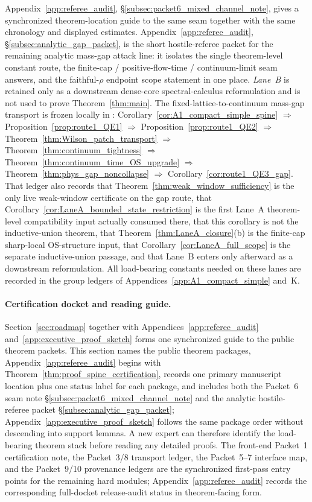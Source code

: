 Appendix~\ref{app:referee_audit}, \S\ref{subsec:packet6_mixed_channel_note}, gives a synchronized theorem-location guide to the same seam together with the same chronology and displayed estimates.
Appendix~\ref{app:referee_audit}, \S\ref{subsec:analytic_gap_packet}, is the short hostile-referee packet for the remaining analytic mass-gap attack line: it isolates the single theorem-level constant route, the finite-cap / positive-flow-time / continuum-limit seam answers, and the faithful-$\rho$ endpoint scope statement in one place.
\emph{Lane~B} is retained only as a downstream dense-core spectral-calculus reformulation and is not used to prove Theorem~\ref{thm:main}.
The fixed-lattice-to-continuum mass-gap transport is frozen locally in : Corollary~\ref{cor:A1_compact_simple_spine} $\Rightarrow$ Proposition~\ref{prop:route1_QE1} $\Rightarrow$ Proposition~\ref{prop:route1_QE2} $\Rightarrow$ Theorem~\ref{thm:Wilson_patch_transport} $\Rightarrow$ Theorem~\ref{thm:continuum_tightness} $\Rightarrow$ Theorem~\ref{thm:continuum_time_OS_upgrade} $\Rightarrow$ Theorem~\ref{thm:phys_gap_noncollapse} $\Rightarrow$ Corollary~\ref{cor:route1_QE3_gap}.
That ledger also records that Theorem~\ref{thm:weak_window_sufficiency} is the only live weak-window certificate on the gap route, that Corollary~\ref{cor:LaneA_bounded_state_restriction} is the first Lane~A theorem-level compatibility input actually consumed there, that this corollary is not the inductive-union theorem, that Theorem~\ref{thm:LaneA_closure}(b) is the finite-cap sharp-local OS-structure input, that Corollary~\ref{cor:LaneA_full_scope} is the separate inductive-union passage, and that Lane~B enters only afterward as a downstream reformulation.
All load-bearing constants needed on these lanes are recorded in the group ledgers of Appendices~\ref{app:A1_compact_simple} and~K.

\paragraph{Certification docket and reading guide.}
Section~\ref{sec:roadmap} together with Appendices~\ref{app:referee_audit} and~\ref{app:executive_proof_sketch} forms one synchronized guide to the public theorem packets.
This section names the public theorem packages, Appendix~\ref{app:referee_audit} begins with Theorem~\ref{thm:proof_spine_certification}, records one primary manuscript location plus one status label for each package, and includes both the Packet~6 seam note \S\ref{subsec:packet6_mixed_channel_note} and the analytic hostile-referee packet \S\ref{subsec:analytic_gap_packet}; Appendix~\ref{app:executive_proof_sketch} follows the same package order without descending into support lemmas.
A new expert can therefore identify the load-bearing theorem stack before reading any detailed proofs.
The front-end Packet~1 certification note, the Packet~3/8 transport ledger, the Packet~5--7 interface map, and the Packet~9/10 provenance ledgers are the synchronized first-pass entry points for the remaining hard modules; Appendix~\ref{app:referee_audit} records the corresponding full-docket release-audit status in theorem-facing form.

